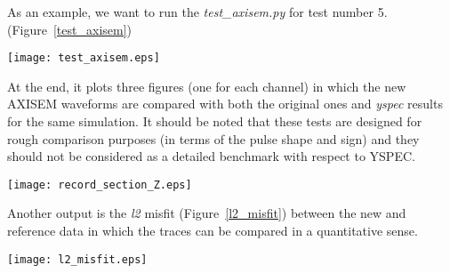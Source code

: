 \documentclass[11pt,letter,fleqn,english,notitlepage]{article}
\begin{document}
\noindent As an example, we want to run the \textit{test\_axisem.py} for test number 5. (Figure~\ref{test_axisem})

\begin{figure*}[htb]
\begin{center}
\texttt{[image: test\_axisem.eps]}
\caption{\textit{Screenshot while running test\_axisem.py}}
\end{center}
\label{test_axisem}
\end{figure*}

\noindent At the end, it plots three figures (one for each channel)
in which the new AXISEM waveforms are compared with both the original ones and \textit{yspec} results for the same simulation.
It should be noted that these tests are designed for rough comparison purposes (in terms of the pulse shape and sign) and they should not be considered as a detailed benchmark with respect to YSPEC. \\

\begin{figure*}[htb]
\begin{center}
\texttt{[image: record\_section\_Z.eps]}
\caption{\textit{Comparing new AXISEM results with the reference solution and \textit{yspec} waveforms. (Z channel)}}
\end{center}
\label{channel_Z}
\end{figure*}

\noindent Another output is the \textit{l2} misfit (Figure~\ref{l2_misfit}) between the new and reference data
in which the traces can be compared in a quantitative sense.

\begin{figure*}[htb]
\begin{center}
\texttt{[image: l2\_misfit.eps]}
\caption{\textit{l2 misfit between the new and reference data.}}
\end{center}
\label{l2_misfit}
\end{figure*}
\end{document}
